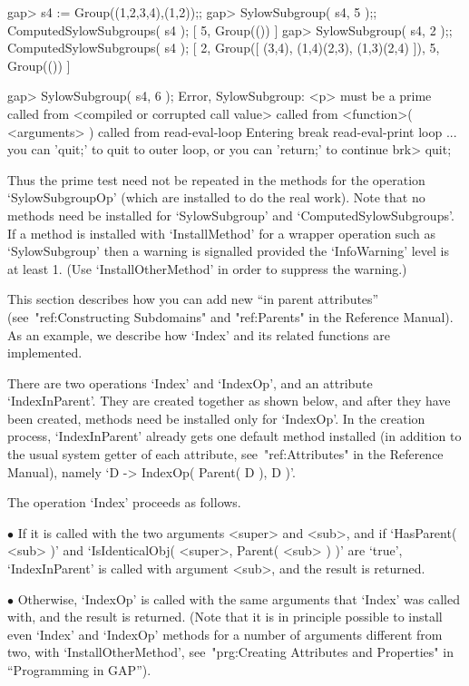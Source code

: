 \beginexample
gap> s4 := Group((1,2,3,4),(1,2));;
gap> SylowSubgroup( s4, 5 );;  ComputedSylowSubgroups( s4 );
[ 5, Group(()) ]
gap> SylowSubgroup( s4, 2 );;  ComputedSylowSubgroups( s4 );
[ 2, Group([ (3,4), (1,4)(2,3), (1,3)(2,4) ]), 5, Group(()) ]
\endexample

\beginexample
gap> SylowSubgroup( s4, 6 );
Error, SylowSubgroup: <p> must be a prime called from
<compiled or corrupted call value>  called from
<function>( <arguments> ) called from read-eval-loop
Entering break read-eval-print loop ...
you can 'quit;' to quit to outer loop, or
you can 'return;' to continue
brk> quit;
\endexample

Thus the prime test need not be repeated in the methods for the operation
`SylowSubgroupOp' (which are installed to do the real work).
Note that no methods need be installed for `SylowSubgroup' and
`ComputedSylowSubgroups'.
If a method is installed with `InstallMethod' for a wrapper operation
such as `SylowSubgroup' then a warning is signalled
provided the `InfoWarning' level is at least 1.
(Use `InstallOtherMethod' in order to suppress the warning.)



This section describes how you can add  new ``in parent attributes''
(see~"ref:Constructing Subdomains" and "ref:Parents" in the Reference Manual).
As an example, we describe how `Index' and its related functions
are implemented.

There are two operations `Index' and `IndexOp',
and an attribute `IndexInParent'.
They are created together as shown below,
and after they have been created,
methods need be installed only for `IndexOp'.
In the creation process, `IndexInParent' already gets one default method
installed
(in addition to the usual system getter of each attribute,
see~"ref:Attributes" in the Reference Manual),
namely `D -> IndexOp( Parent( D ), D )'.

The operation `Index' proceeds as follows.
\beginlist%
\item{$\bullet$}
  If it is called with the two arguments <super> and <sub>, and if
  `HasParent( <sub> )' and `IsIdenticalObj( <super>, Parent( <sub> ) )'
  are `true', `IndexInParent' is called with argument <sub>,
  and the result is returned.
\item{$\bullet$}
  Otherwise, `IndexOp' is called with the same arguments that `Index' was
  called with, and the result is returned.
\endlist
(Note that it is in principle possible to install even `Index' and
`IndexOp' methods for a number of arguments different from two,
with `InstallOtherMethod',
see~"prg:Creating Attributes and Properties" in ``Programming in GAP'').


